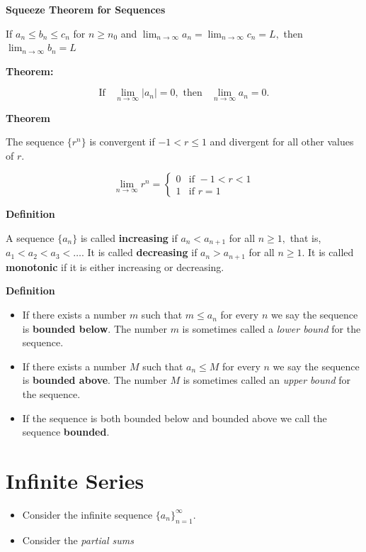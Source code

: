 \documentclass[]{book}
\providecommand{\tightlist}{%
  \setlength{\itemsep}{0pt}\setlength{\parskip}{0pt}}
\begin{document}
\textbf{Squeeze Theorem for Sequences}

If \(a_n \leq b_n \leq c_n\) for \(n\geq n_0\) and \(\lim_{n \to \infty}a_n= \lim_{n \to \infty}c_n= L,\) then \(\lim_{n \to \infty}b_n=L\)

\textbf{Theorem:}

\[\text{If }\;\; \lim_{n \to \infty}|a_n|=0, \text{ then } \;\;\lim_{n \to \infty}a_n=0.\]

\textbf{Theorem}

The sequence \(\{r^n\}\) is convergent if \(-1 <r\leq1\) and divergent for all other values of \(r\).

\begin{equation}
\lim_{n \to \infty}r^n=
\begin{cases} 
0 & \text{if } -1<r<1\\
1 & \text{if } r=1
\end{cases}
\end{equation}

\textbf{Definition}

A sequence \(\{a_n\}\) is called \textbf{increasing} if \(a_n<a_{n+1}\) for all \(n \geq 1,\) that is, \(a_1<a_2<a_3<\dots.\) It is called \textbf{decreasing} if \(a_n>a_{n+1}\) for all \(n\geq 1.\) It is called \textbf{monotonic} if it is either increasing or decreasing.

\newpage

\textbf{Definition}

\begin{itemize}
\item
  If there exists a number \(m\) such that \(m \leq a_n\) for every \(n\) we say the sequence is \textbf{bounded below}. The number \(m\) is sometimes called a \emph{lower bound} for the sequence.
\item
  If there exists a number \(M\) such that \(a_n \leq M\) for every \(n\) we say the sequence is \textbf{bounded above}. The number \(M\) is sometimes called an \emph{upper bound} for the sequence.
\item
  If the sequence is both bounded below and bounded above we call the sequence \textbf{bounded}.
\end{itemize}

\hypertarget{infinite-series}{%
\section{Infinite Series}\label{infinite-series}}

\begin{itemize}
\tightlist
\item
  Consider the infinite sequence \(\{a_n\}_{n=1}^\infty\).
\item
  Consider the \emph{partial sums}
\end{itemize}
\end{document}
